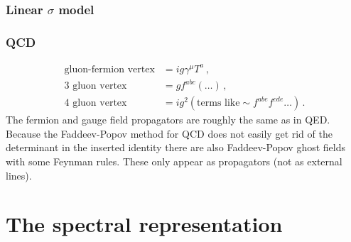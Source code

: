 \documentclass[12pt]{memoir}
\begin{document}
\begin{appendices}
  \subsection{Linear $\sigma$ model}

  \subsection{QCD}

  \begin{align}
    \text{gluon-fermion vertex} &= i g \gamma^{\mu} T^a\,, \\
    \text{3 gluon vertex} &= g f^{abc}(\ldots)\,, \\
    \text{4 gluon vertex} &= i g^2 (\text{terms like} \sim f^{abe}f^{cde} \ldots)\,.
  \end{align}
  The fermion and gauge field propagators are roughly the same as in QED.
  Because the Faddeev-Popov method for QCD does not easily get rid of the determinant in the inserted identity
  there are also Faddeev-Popov ghost fields with some Feynman rules.
  These only appear as propagators (not as external lines).




  \chapter{The spectral representation}

\end{appendices}

\backmatter{}

\nocite{*} %

\end{document}
